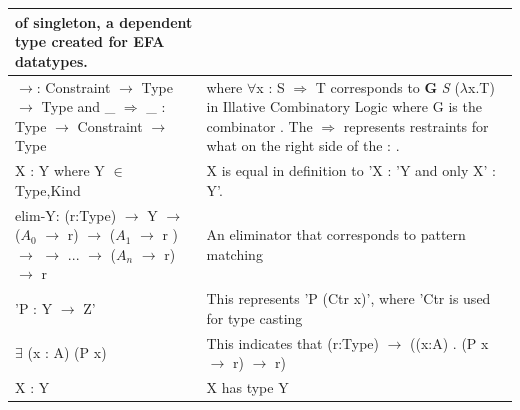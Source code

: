\documentclass[12pt]{report}
\begin{document}
\begin{longtable}{|m{5cm}|m{9cm}| }
           of singleton, a dependent type created for EFA datatypes. \\ 
        \hline
          $\rightarrow$: Constraint $\rightarrow$ Type $\rightarrow$ Type  and  
          \_ $\Rightarrow$ \_ : Type $\rightarrow$ Constraint $\rightarrow$ 
          Type    &  where $\forall$x : S $\Rightarrow$ T corresponds to 
          $\mathbf{G}$ \textit{S} ($\lambda$x.T) in Illative Combinatory 
          Logic 
          where G is the combinator \cite{CombLogic}. The $\Rightarrow$ 
          represents restraints for what on the right side of the : .\\ 
        \hline
        X : Y  where Y $\in$ {Type,Kind} &  X is equal in definition to 'X : 'Y 
        and only X' : Y'. \\ 
        \hline
        elim-Y: (r:Type) $\rightarrow$ Y $\rightarrow$ ($A_0$ $\rightarrow$ r) 
        $\rightarrow$ ($A_1$ $\rightarrow$ r ) $\rightarrow$ $\rightarrow$ 
        $...$ $\rightarrow$ ($A_n$ $\rightarrow$ r) $\rightarrow$ r   &  An 
        eliminator that corresponds to pattern matching \\ 
        \hline
        'P : Y $\rightarrow$ Z'   &  This represents 'P (Ctr x)', where 'Ctr  
        is used for type casting\\ 
        \hline
         $\exists$ (x : A) (P x) & This indicates that (r:Type) $\rightarrow$ 
         ((x:A) . (P x $\rightarrow$ r) $\rightarrow$ r) \\ 
        \hline
        X : Y   &  X has type Y \\ 
        \hline
        
\end{longtable}
\end{document}
